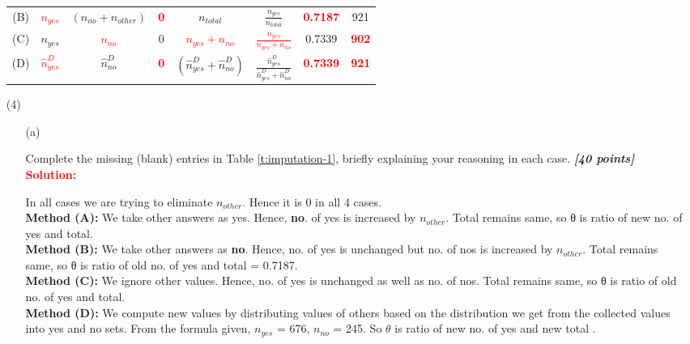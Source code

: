 \documentclass[12pt]{article}
\newcommand{\bi}[1]{\b{\i{#1}}}
\renewcommand{\b}[1]{\textbf{#1}}
\renewcommand{\i}[1]{\textit{#1}}
\begin{document}
\begin{itemize}
\begin{table}[t!]
\begin{tabular}{c||ccccc||cc}
\rule{0pt}{3ex} (B) & \textit{\textcolor{red}{$n_{yes}$}} & $( n_{ no } + n_{ other } )$ & \textbf{\textcolor{red}{0}}& $n_{ total }$ & $\frac{ n_{ yes } }{ n_{ total } }$ & \textbf{\textcolor{red}{0.7187}} & 921 \\

\rule{0pt}{3ex} (C) & $n_{ yes }$ & \textit{\textcolor{red}{$n_{no}$}} & 0 & \textit{\textcolor{red}{$n_{yes} + n_{no}$}} & \textit{\textcolor{red}{$\frac{n_{yes}}{n_{yes} + n_{no}}$}} & 0.7339 & \textbf{\textcolor{red}{902}}\\

\rule{0pt}{3ex} (D) & \textit{\textcolor{red}{$ \hat{ n }_{ yes }^D$}} & $\hat{ n }_{ no }^D$ & \textbf{\textcolor{red}{0}} & $( \hat{ n }_{ yes }^D + \hat{ n }_{ no }^D )$ & $\frac{ \hat{ n }_{ yes }^D }{ \hat{ n }_{ yes }^D + \hat{ n }_{ no }^D }$ & \textbf{\textcolor{red}{0.7339}} & \textbf{\textcolor{red}{921}}

\end{tabular}

\end{table}

\newenvironment{Solution4}[1]{%
    \leavevmode\color{#1}\ignorespaces%
}{%
}%

\item[(4)]

\begin{itemize}

\item[(a)]

Complete the missing (blank) entries in Table \ref{t:imputation-1}, briefly explaining your reasoning in each case. \bi{[40 points]}\\
\textbf{\textcolor{red}{Solution:}}
\begin{Solution4}{blue}
In all cases we are trying to eliminate $n_{other}$. Hence it is 0 in all 4 cases.\\
\textbf{Method (A):} We take other answers as yes. Hence, \textbf{no}. of yes is increased by $n_{other}$. Total remains same, so θ is ratio of new no. of yes and total.\\
\textbf{Method (B):} We take other answers as \textbf{no}. Hence, no. of yes is unchanged but no.
of nos is increased by $n_{other}$. Total remains same, so θ is ratio of old no. of yes and
total = 0.7187.\\
\textbf{Method (C):} We ignore other values. Hence, no. of yes is unchanged as well as no.
of nos. Total remains same, so θ is ratio of old no. of yes and total.\\
\textbf{Method (D):} We compute new values by distributing values of others based on the
distribution we get from the collected values into yes and no sets. From the formula
given, $n_{yes}$ = 676, $n_{no}$ = 245.
So \textbf{$\theta$} is ratio of new no. of yes and new total .
\end{Solution4}
\vspace*{1.5in}


\end{itemize}
\end{itemize}
\end{document}
